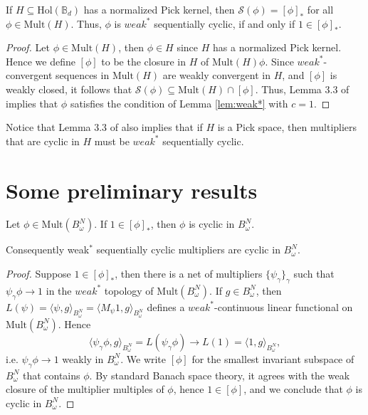 \documentclass{article}
\numberwithin{equation}{section}
\newcommand{\MH}{\mathrm{Mult}( H)}
\newcommand{\la}{\langle}
\newcommand{\ra}{\rangle}
\newcommand{\Bd}{\mathbb B_d}
\begin{document}
\begin{cor}
    
\label{cor:Pick} If $H\subseteq \mathrm{Hol}(\Bd)$ has a normalized Pick kernel, then $\mathcal S(\phi)=[\phi]_*$ for all $\phi\in \MH$. Thus, $\phi$ is $weak^\ast$ sequentially cyclic, if and only if $1\in [\phi]_\ast$.
\end{cor}
\begin{proof} Let $\phi\in \MH$, then $\phi\in H$ since $H$ has a normalized Pick kernel. Hence we define $[\phi]$ to be the closure in $H$ of $\MH \phi$. Since $weak^\ast$-convergent sequences in $\MH$ are weakly convergent in $H$, and $[\phi]$ is weakly closed, it follows that $\mathcal S(\phi)\subseteq \MH\cap [\phi]$. Thus, Lemma 3.3 of \cite{AlemanHartzMcCarthyRichter2023} implies that $\phi$ satisfies the condition of Lemma \ref{lem:weak*} with $c=1$.
\end{proof}
Notice that Lemma 3.3 of \cite{AlemanHartzMcCarthyRichter2023} also implies that if $H$ is a Pick space, then multipliers that are cyclic in $H$ must be $weak^\ast$ sequentially cyclic.
    
\section{Some preliminary results}
\begin{lem}\label{lem:*cyclic is cyclic} Let  $\phi \in \mathrm{Mult}(B^{N}_{\omega})$. If $1\in [\phi]_\ast$, then $\phi$ is cyclic in $B^{N}_{\omega}$.

Consequently  weak$^\ast$ sequentially cyclic multipliers are cyclic  in $B^{N}_{\omega}$.
\end{lem}

\begin{proof}
Suppose  $1\in [\phi]_\ast$, then there is a net of multipliers $\{\psi_\gamma\}_\gamma$ such that $\psi_\gamma \phi \to 1$ in the $weak^\ast$ topology of $\mathrm{Mult}(B^{N}_{\omega})$. If $g\in B^N_\omega$, then $L(\psi)=\la \psi , g\ra_{B^N_\omega}= \la M_\psi 1, g\ra_{B^N_\omega}$ defines a $weak^\ast$-continuous linear functional on $\mathrm{Mult}(B^N_\omega)$. Hence 
$$\la \psi_\gamma \phi,g\ra_{B^N_\omega}=L(\psi_\gamma \phi)\to L(1)=\la 1,g\ra_{B^N_\omega},$$
i.e. $\psi_\gamma \phi \to 1$ weakly in $B^N_\omega$. We write $[\phi]$ for the smallest invariant subspace of $B^N_\omega$ that contains $\phi$. By standard Banach space theory, it agrees with the weak closure of the multiplier multiples of $\phi$, hence  $1\in [\phi]$, and we conclude that $\phi$ is cyclic in $B^N_\omega$.
\end{proof}
\end{document}
